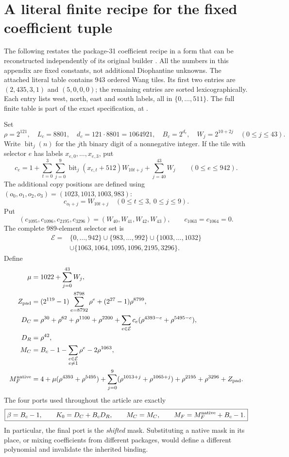 \section{A literal finite recipe for the fixed coefficient tuple}\label{sec:coefficients}

The following restates the package-31 coefficient recipe in a form that
can be reconstructed independently of its original builder
\cite{package31}. All the numbers in this appendix are fixed constants,
not additional Diophantine unknowns. The attached literal table contains
943 ordered Wang tiles. Its first two entries are
$(2,435,3,1)$ and $(5,0,0,0)$; the remaining entries are sorted
lexicographically. Each entry lists west, north, east and south labels,
all in $\{0,\ldots,511\}$. The full finite table is part of the exact
specification, at .

Set
\[
 \rho=2^{121},\quad L_c=8801,\quad d_c=121\cdot8801=1064921,
 \quad B_c=2^{d_c},\quad W_j=2^{10+2j}\quad(0\le j\le43).
\]
Write $\operatorname{bit}_j(n)$ for the $j$th binary digit of a
nonnegative integer. If the tile with selector $e$ has labels
$x_{e,0},\ldots,x_{e,3}$, put
\[
 c_e=1+\sum_{t=0}^3\sum_{j=0}^9
       \operatorname{bit}_j(x_{e,t}+512)W_{10t+j}
       +\sum_{j=40}^{43}W_j \qquad (0\le e\le942).
\]
The additional copy positions are defined using
$(o_0,o_1,o_2,o_3)=(1023,1013,1003,983)$:
\[
 c_{o_t+j}=W_{10t+j}\quad(0\le t\le3,\ 0\le j\le9).
\]
Put
\[
 (c_{1095},c_{1096},c_{2195},c_{3296})=(W_{40},W_{41},W_{42},W_{43}),
 \qquad c_{1063}=c_{1064}=0.
\]
The complete 989-element selector set is
\begin{align*}
 \mathcal E={}&\{0,\ldots,942\}\cup\{983,\ldots,992\}
 \cup\{1003,\ldots,1032\}\\
 &\cup\{1063,1064,1095,1096,2195,3296\}.
\end{align*}
Define
\begin{align*}
 \mu&=1022+\sum_{j=0}^{43}W_j,\\
 Z_{\rm pad}&=(2^{119}-1)\sum_{e=8792}^{8798}\rho^e
                 +(2^{27}-1)\rho^{8799},\\
 D_C&=\rho^{30}+\rho^{62}+\rho^{1100}+\rho^{2200}
       +\sum_{e\in\mathcal E}c_e
                  (\rho^{4393-e}+\rho^{5495-e}),\\
 D_R&=\rho^{42},\\
 M_C&=B_c-1-\sum_{\substack{e\in\mathcal E\\e\ne1}}\rho^e
                    -2\rho^{1063},\\
 M_F^{\rm native}&=4+\mu(\rho^{4393}+\rho^{5495})
       +\sum_{j=0}^9(\rho^{1013+j}+\rho^{1065+j})
       +\rho^{2195}+\rho^{3296}+Z_{\rm pad}.
\end{align*}
The four ports used throughout the article are exactly
\begin{equation}\label{eq:coefficienttuple}
 \boxed{\beta=B_c-1,\qquad K_0=D_C+B_cD_R,\qquad
        M_C=M_C,\qquad M_F=M_F^{\rm native}+B_c-1.}
\end{equation}
In particular, the final port is the \emph{shifted} mask. Substituting a
native mask in its place, or mixing coefficients from different packages,
would define a different polynomial and invalidate the inherited binding.

